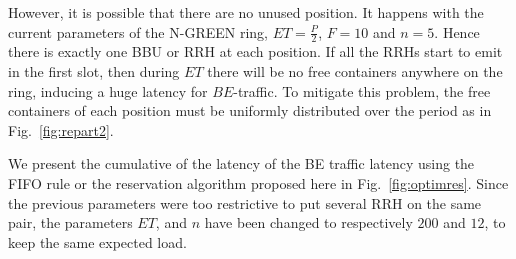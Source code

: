\documentclass[]{algotel}
\newtheorem{prop}{Proposition}
\begin{document}
However, it is possible that there are no unused position. It happens with the current parameters of the N-GREEN ring,
$ET = \frac{P}{2}$, $F = 10$ and $n = 5$. Hence there is exactly one  BBU or RRH at each position. If all the RRHs start to emit in the first slot, then during $ET$ there will be no free containers anywhere on the ring, inducing a huge latency for $BE$-traffic. 
To mitigate this problem, the free containers of each position must be uniformly distributed over the period as in Fig.~\ref{fig:repart2}.

We present the cumulative of the latency of the BE traffic latency using the FIFO rule or the reservation algorithm proposed here in
Fig.~\ref{fig:optimres}. Since the previous parameters were too restrictive to put several RRH on the same pair, the parameters $ET$, and $n$ have been changed to respectively $200$ and $12$, to keep the same expected load.
% 
%  
%  
\end{document}
